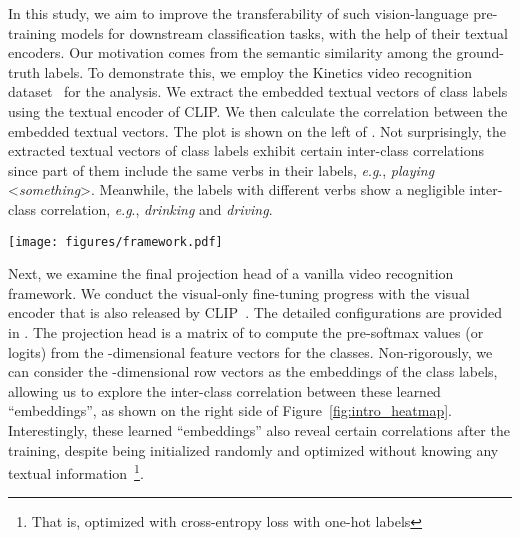 \documentclass[letterpaper]{article} \usepackage{aaai23}  \usepackage{times}  \usepackage{helvet}  \usepackage{courier}  \usepackage[hyphens]{url}  \usepackage{graphicx} \urlstyle{rm} \def\UrlFont{\rm}  \usepackage{natbib}  \usepackage{caption} \frenchspacing  \setlength{\pdfpagewidth}{8.5in}  \setlength{\pdfpageheight}{11in}  \usepackage{algorithm}
\newcommand{\eg}{\textit{e}.\textit{g}.}
\begin{document}
In this study, we aim to improve the transferability of such vision-language pre-training models for downstream classification tasks, with the help of their textual encoders. Our motivation comes from the semantic similarity among the ground-truth labels. To demonstrate this, we employ the Kinetics video recognition dataset~\cite{kay2017kinetics} for the analysis. We extract the embedded textual vectors of class labels using the textual encoder of CLIP. We then calculate the correlation between the embedded textual vectors. 
The plot is shown on the left of . Not surprisingly, the extracted textual vectors of class labels exhibit certain inter-class correlations since part of them include the same verbs in their labels, \eg, \textit{playing} \textless\textit{something}\textgreater. Meanwhile, the labels with different verbs show a negligible inter-class correlation, \eg, \textit{drinking} and \textit{driving}.


\begin{figure*}[t]
\begin{center}
\texttt{[image: figures/framework.pdf]}
\end{center}
\caption{Illustration of transferring vision-language pre-trained models for video recognition. (a) The widely-used standard vision-only tuning paradigm with cross-entropy loss. (b) The vision-language tuning paradigm with contrastive loss. (c) Revisiting the role of the classifier to transfer knowledge from vision-language pre-trained models (\eg, CLIP).
}
\label{fig:approach}
\end{figure*}

Next, we examine the final projection head of a vanilla video recognition framework. We conduct the visual-only fine-tuning progress with the visual encoder that is also released by CLIP~\cite{CLIP}. The detailed configurations are provided in . The projection head is a matrix of  to compute the pre-softmax values (or logits) from the -dimensional feature vectors for the  classes. Non-rigorously, we can consider the -dimensional row vectors as the embeddings of the class labels, allowing us to explore the inter-class correlation between these learned ``embeddings'', as shown on the right side of Figure~\ref{fig:intro_heatmap}. 
Interestingly, these learned ``embeddings'' also reveal certain correlations after the training, despite being initialized randomly and optimized without knowing any textual information~\footnote{That is, optimized with cross-entropy loss with one-hot labels}.
\end{document}

